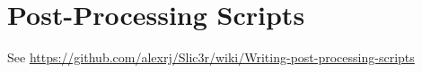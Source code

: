 
\section{Post-Processing Scripts} %
\label{sec:post_processing_scripts}

See \url{https://github.com/alexrj/Slic3r/wiki/Writing-post-processing-scripts}

